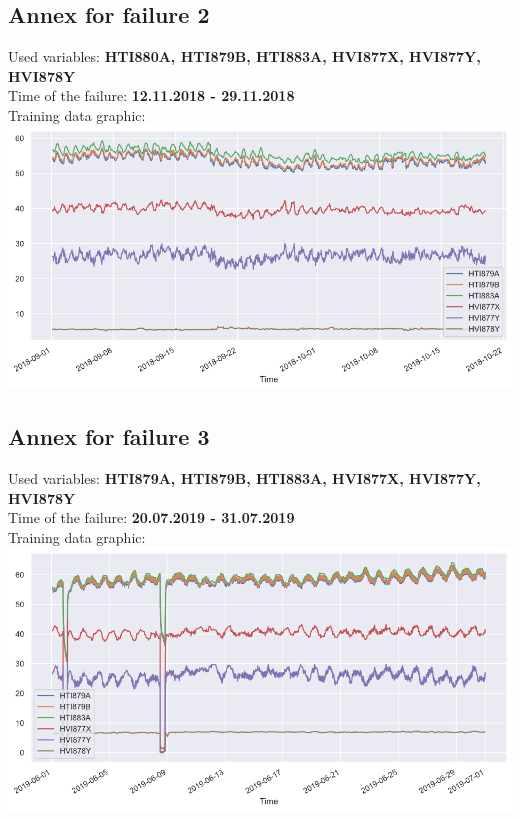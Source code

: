 \documentclass[
]{article}
\begin{document}
\hypertarget{annex-for-failure-2}{%
\subsection{Annex for failure 2}\label{annex-for-failure-2}}

Used variables: \textbf{HTI880A, HTI879B, HTI883A, HVI877X, HVI877Y,
HVI878Y}\\
Time of the failure: \textbf{12.11.2018 - 29.11.2018}\\
Training data graphic:\\
\includegraphics{relevant_graphs/train_fail2.png}

\hypertarget{annex-for-failure-3}{%
\subsection{Annex for failure 3}\label{annex-for-failure-3}}

Used variables: \textbf{HTI879A, HTI879B, HTI883A, HVI877X, HVI877Y,
HVI878Y}\\
Time of the failure: \textbf{20.07.2019 - 31.07.2019}\\
Training data graphic:\\
\includegraphics{relevant_graphs/train_fail3.png}
\end{document}
